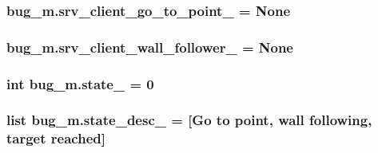 \subsubsection[{\texorpdfstring{srv\+\_\+client\+\_\+go\+\_\+to\+\_\+point\+\_\+}{srv_client_go_to_point_}}]{\setlength{\rightskip}{0pt plus 5cm}bug\+\_\+m.\+srv\+\_\+client\+\_\+go\+\_\+to\+\_\+point\+\_\+ = None}\hypertarget{namespacebug__m_abd32bbd25b55f71e56505e72ba56c2f6}{}\label{namespacebug__m_abd32bbd25b55f71e56505e72ba56c2f6}
\subsubsection[{\texorpdfstring{srv\+\_\+client\+\_\+wall\+\_\+follower\+\_\+}{srv_client_wall_follower_}}]{\setlength{\rightskip}{0pt plus 5cm}bug\+\_\+m.\+srv\+\_\+client\+\_\+wall\+\_\+follower\+\_\+ = None}\hypertarget{namespacebug__m_af40e8063430e5b54ef2f3f8368338744}{}\label{namespacebug__m_af40e8063430e5b54ef2f3f8368338744}
\subsubsection[{\texorpdfstring{state\+\_\+}{state_}}]{\setlength{\rightskip}{0pt plus 5cm}int bug\+\_\+m.\+state\+\_\+ = 0}\hypertarget{namespacebug__m_a79dc362dff5bef439beacdd5c0c3b2f1}{}\label{namespacebug__m_a79dc362dff5bef439beacdd5c0c3b2f1}
\subsubsection[{\texorpdfstring{state\+\_\+desc\+\_\+}{state_desc_}}]{\setlength{\rightskip}{0pt plus 5cm}list bug\+\_\+m.\+state\+\_\+desc\+\_\+ = \mbox{[}\textquotesingle{}Go to point\textquotesingle{}, \textquotesingle{}wall following\textquotesingle{}, \textquotesingle{}target reached\textquotesingle{}\mbox{]}}\hypertarget{namespacebug__m_ae70f71d3816862f72790fae7bfaa543b}{}\label{namespacebug__m_ae70f71d3816862f72790fae7bfaa543b}
